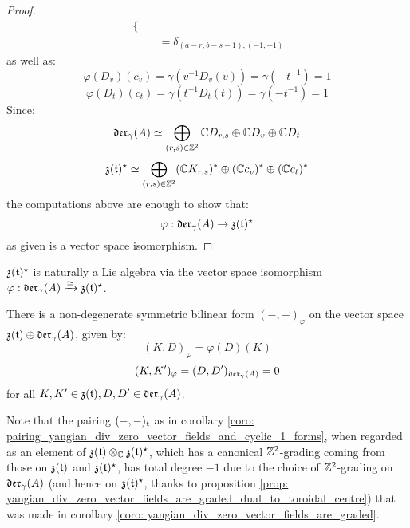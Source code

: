 \begin{proof}
$$\begin{aligned}
\begin{cases}
                            \end{cases}
                            \\
                            & = \delta_{(a - r, b - s - 1), (-1, -1)}
                        \end{aligned}
                    $$
                as well as:
                    $$\varphi(D_v)(c_v) = \gamma(v^{-1} D_v(v)) = \gamma( -t^{-1} ) = 1$$
                    $$\varphi(D_t)(c_t) = \gamma(t^{-1} D_t(t)) = \gamma( -t^{-1} ) = 1$$
                Since:
                    $$\mathfrak{der}_{\gamma}(A) \simeq \bigoplus_{(r, s) \in \mathbb{Z}^2} \mathbb{C} D_{r, s} \oplus \mathbb{C} D_v \oplus \mathbb{C} D_t$$
                    $$\mathfrak{z}(\mathfrak{t})^{\star} \simeq \bigoplus_{(r, s) \in \mathbb{Z}^2} (\mathbb{C} K_{r, s})^* \oplus (\mathbb{C} c_v)^* \oplus (\mathbb{C} c_t)^*$$
                the computations above are enough to show that:
                    $$\varphi: \mathfrak{der}_{\gamma}(A) \to \mathfrak{z}(\mathfrak{t})^{\star}$$
                as given is a vector space isomorphism.
            \end{proof}
        \begin{corollary} \label{coro: lie_bracket_on_graded_dual_of_toroidal_centres}
            $\mathfrak{z}(\mathfrak{t})^{\star}$ is naturally a Lie algebra via the vector space isomorphism $\varphi: \mathfrak{der}_{\gamma}(A) \xrightarrow[]{\simeq} \mathfrak{z}(\mathfrak{t})^{\star}$.
        \end{corollary}
        \begin{corollary} \label{coro: pairing_yangian_div_zero_vector_fields_and_cyclic_1_forms}
            There is a non-degenerate symmetric bilinear form $(-, -)_{\varphi}$ on the vector space $\mathfrak{z}(\mathfrak{t}) \oplus \mathfrak{der}_{\gamma}(A)$, given by:
                $$(K, D)_{\varphi} = \varphi(D)(K)$$
                $$(K, K')_{\varphi} = (D, D')_{\mathfrak{der}_{\gamma}(A)} = 0$$
            for all $K, K' \in \mathfrak{z}(\mathfrak{t}), D, D' \in \mathfrak{der}_{\gamma}(A)$.
        \end{corollary}
        \begin{remark}
            Note that the pairing $(-, -)_{\mathfrak{t}}$ as in corollary \ref{coro: pairing_yangian_div_zero_vector_fields_and_cyclic_1_forms}, when regarded as an element of $\z(\toroidal) \tensor_{\bbC} \z(\toroidal)^{\star}$, which has a canonical $\mathbb{Z}^2$-grading coming from those on $\mathfrak{z}(\mathfrak{t})$ and $\mathfrak{z}(\mathfrak{t})^{\star}$, has total degree $-1$ due to the choice of $\mathbb{Z}^2$-grading on $\mathfrak{der}_{\gamma}(A)$ (and hence on $\mathfrak{z}(\mathfrak{t})^{\star}$, thanks to proposition \ref{prop: yangian_div_zero_vector_fields_are_graded_dual_to_toroidal_centre}) that was made in corollary \ref{coro: yangian_div_zero_vector_fields_are_graded}.
        \end{remark}